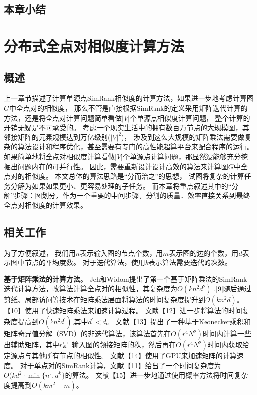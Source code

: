 \documentclass[master]{njuthesis}
\begin{document}
\section{本章小结}
\chapter{分布式全点对相似度计算方法}\label{chapter_allSimRank}
\section{概述}
上一章节描述了计算单源点SimRank相似度的计算方法，如果进一步地考虑计算图$G$中全点对的相似度，
那么不管是直接根据SimRank的定义采用矩阵迭代计算的方法，还是将全点对计算问题简单看做$|V|$个单源点相似度计算问题，
整个计算的开销无疑是不可承受的。
考虑一个现实生活中的拥有数百万节点的大规模图，其邻接矩阵的元素规模达到万亿级别($|V|^2$)，
涉及到这么大规模的矩阵乘法需要做复杂的算法设计和程序优化，甚至需要有专门的高性能超算平台来配合程序的运行。
如果简单地将全点对相似度计算看做$|V|$个单源点计算问题，那显然没能够充分挖掘出问题内在的可并行性。
因此，需要重新设计设计高效的算法来计算图$G$中全点对的相似度。
本文总体的算法思路是“分而治之”的思想，
试图将复杂的计算任务分解为如果如果更小、更容易处理的子任务。
而本章将重点叙述其中的“分解”步骤：图划分，作为一个重要的中间步骤，分割的质量、效率直接关系到最终全点对相似度的计算效果。
\section{相关工作}
为了方便叙述， 我们用$n$表示输入图的节点个数，用$m$表示图的边的个数，用$d$表示图中节点的平均度数。 
对于迭代算法，使用$k$表示算法需要迭代的次数。

\textbf{基于矩阵乘法的计算方法}。 Jeh和Widom提出了第一个基于矩阵乘法的SimRank迭代计算方法，改算法计算全点对的相似性，其复杂度为$O(kn^2d^2)$
.[9]随后通过剪纸、局部访问等技术在矩阵乘法层面将算法的时间复杂度提升到$O(kn^2d)$。【10】使用了快速矩阵乘法来加速计算过程。
文献【12】进一步将算法的时间复杂度提高到$O(kn^2d^{\prime})$,其中$d^\prime < d$。
文献【13】提出了一种基于Keonecker乘积和矩阵奇异值分解（SVD）的非迭代算法，该算法首先在$O(r^4N^2)$时间内计算一些出辅助矩阵，其中$r$是
输入图的领接矩阵的秩，然后再在$O(r^4N^2)$时间内获取给定源点与其他所有节点的相似性。
文献【14】使用了GPU来加速矩阵的计算速度。
对于单点对的SimRank计算，文献【11】给出了一个时间复杂度为$O(kd^2\cdot \min{\{n^2, d^k\}}$的算法。
文献【15】进一步地通过使用概率方法将时间复杂度提高到$O(km^2-m)$。
\end{document}

